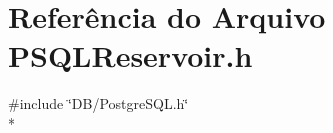 \section{Referência do Arquivo P\+S\+Q\+L\+Reservoir.\+h}
\label{_p_s_q_l_reservoir_8h}
{\ttfamily \#include \char`\"{}D\+B/\+Postgre\+S\+Q\+L.\+h\char`\"{}}\\*
